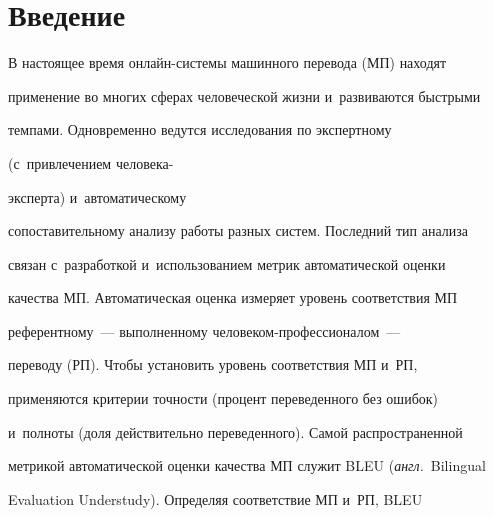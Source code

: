  \thispagestyle{headings}


 




    


\section{Введение}










   В настоящее время онлайн-сис\-те\-мы машинного перевода (МП) находят 


применение во многих сферах человеческой жизни и~развиваются быстрыми 


темпами. Одновременно ведутся исследования по экспертному 


(с~привлечением че\-ло\-ве\-ка-\linebreak\vspace*{-12pt}





\pagebreak





\noindent


экс\-пер\-та) и~автоматическому 


сопоставительному анализу работы разных сис\-тем. Последний тип анализа 


связан с~разработкой и~использованием метрик автоматической оценки 


качества МП. Автоматическая оценка измеряет уровень соответствия МП 


референтному~--- выполненному че\-ло\-ве\-ком-про\-фес\-сио\-на\-лом~--- 


переводу (РП). Чтобы установить уровень соответствия МП и~РП, 


применяются критерии точ\-ности (процент переведенного без ошибок) 


и~полноты (доля действительно переведенного). Самой распространенной 


метрикой автоматической оценки качества МП служит BLEU (\textit{англ.}\ Bilingual 


Evaluation Understudy). Определяя соответствие МП и~РП, BLEU 


